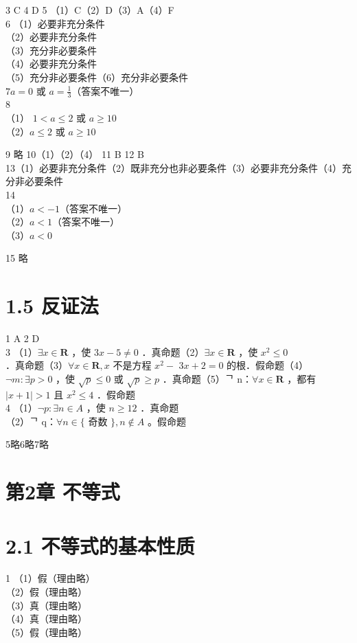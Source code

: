 \documentclass[10pt]{article}
\begin{document}
3 C 4 D 5 （1）C（2）D（3）A（4）F\\
6 （1）必要非充分条件\\
（2）必要非充分条件\\
（3）充分非必要条件\\
（4）必要非充分条件\\
（5）充分非必要条件（6）充分非必要条件\\
\(7 a=0\) 或 \(a=\frac{1}{3}\)（答案不唯一）\\
8\\
（1） \(1<a \leqslant 2\) 或 \(a \geqslant 10\)\\
（2）\(a \leqslant 2\) 或 \(a \geqslant 10\)

9 略 10（1）（2）（4） 11 B 12 B\\
13（1）必要非充分条件（2）既非充分也非必要条件（3）必要非充分条件（4）充分非必要条件\\
14\\
（1）\(a<-1\)（答案不唯一）\\
（2）\(a<1\)（答案不唯一）\\
（3）\(a<0\)

15 略

\section*{1.5 反证法}
1 A 2 D\\
3 （1）\(\exists x \in \mathbf{R}\) ，使 \(3 x-5 \neq 0\) ．真命题（2）\(\exists x \in \mathbf{R}\) ，使 \(x^{2} \leqslant 0\) ．真命题（3）\(\forall x \in \mathbf{R}, x\) 不是方程 \(x^{2}-\) \(3 x+2=0\) 的根．假命题（4）\(\neg m: \exists p>0\) ，使 \(\sqrt{p} \leqslant 0\) 或 \(\sqrt{p} \geqslant p\) ．真命题（5）ᄀ n：\(\forall x \in \mathbf{R}\) ，都有 \(|x+1|>1\) 且 \(x^{2} \leqslant 4\) ．假命题\\
4 （1）\(\neg p: \exists n \in A\) ，使 \(n \geqslant 12\) ．真命题\\
（2）ᄀ q：\(\forall n \in\{\) 奇数 \(\}, n \notin A\) 。假命题

5略6略7略

\section*{第2章 不等式}
\section*{2.1 不等式的基本性质}
1 （1）假（理由略）\\
（2）假（理由略）\\
（3）真（理由略）\\
（4）真（理由略）\\
（5）假（理由略）
\end{document}
